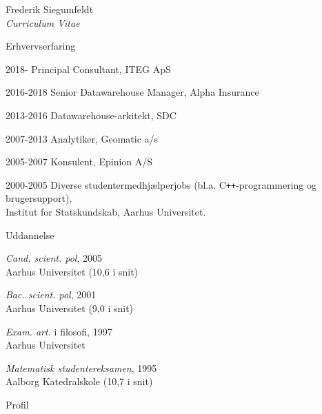 \documentclass[a4paper]{article}
\begin{document}
 

\setlength{\cvlabelwidth}{35mm}

\begin{cv}{Frederik Siegumfeldt\\{\large \itshape Curriculum Vitae}}

\begin{cvlist}{Erhvervserfaring}

  \item[2018-]       Principal Consultant, ITEG ApS

  \item[2016-2018]   Senior Datawarehouse Manager, Alpha Insurance

  \item[2013-2016]   Datawarehouse-arkitekt, SDC

  \item[2007-2013]   Analytiker, Geomatic a/s
      
  \item[2005-2007]   Konsulent, Epinion A/S
      
  \item[2000-2005]   Diverse studentermedhjælperjobs (bl.a. 
                     C{}\verb!++!-programmering og brugersupport), \\ 
                     Institut for Statskundskab, Aarhus Universitet.

\end{cvlist}

\begin{cvlist}{Uddannelse}          

  \item \emph{Cand. scient. pol}, 2005 \\
    Aarhus Universitet (10,6 i snit) 
    
  \item \emph{Bac. scient. pol}, 2001 \\
    Aarhus Universitet (9,0 i snit) 
    
  \item \emph{Exam. art.} i filosofi, 1997 \\
    Aarhus Universitet

  \item \emph{Matematisk studentereksamen}, 1995 \\
    Aalborg Katedralskole (10,7 i snit)

\end{cvlist}

\begin{cvlist}{Profil}


\end{cvlist}
\end{cv}
\end{document}
